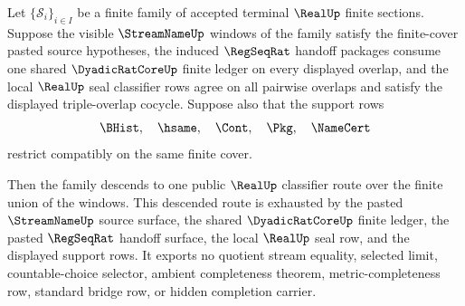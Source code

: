 \begin{theorem}
\label{thm:real-terminal-finite-cover-seal-descent}
Let $\{\mathcal S_i\}_{i\in I}$ be a finite family of accepted terminal
$\RealUp$ finite sections. Suppose the visible $\StreamNameUp$ windows of the
family satisfy the finite-cover pasted source hypotheses, the induced
$\RegSeqRat$ handoff packages consume one shared $\DyadicRatCoreUp$ finite
ledger on every displayed overlap, and the local $\RealUp$ seal classifier
rows agree on all pairwise overlaps and satisfy the displayed triple-overlap
cocycle. Suppose also that the support rows
$$
\BHist,\quad \hsame,\quad \Cont,\quad \Pkg,\quad \NameCert
$$
restrict compatibly on the same finite cover.

Then the family descends to one public $\RealUp$ classifier route over the
finite union of the windows. This descended route is exhausted by the pasted
$\StreamNameUp$ source surface, the shared $\DyadicRatCoreUp$ finite ledger,
the pasted $\RegSeqRat$ handoff surface, the local $\RealUp$ seal row, and the
displayed support rows. It exports no quotient stream equality, selected
limit, countable-choice selector, ambient completeness theorem,
metric-completeness row, standard bridge row, or hidden completion carrier.
\end{theorem}
